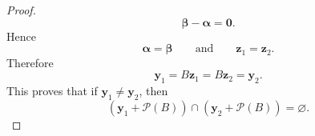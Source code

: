 \begin{proof}
	\[
	\boldsymbol\beta-\boldsymbol\alpha=\mathbf 0.
	\]
	Hence
	\[
	\boldsymbol\alpha=\boldsymbol\beta
	\qquad\text{and}\qquad
	\mathbf z_1=\mathbf z_2.
	\]
	Therefore
	\[
	\mathbf y_1=B\mathbf z_1=B\mathbf z_2=\mathbf y_2.
	\]
	This proves that if \(\mathbf y_1\neq \mathbf y_2\), then
	\[
	(\mathbf y_1+\mathcal P(B))\cap(\mathbf y_2+\mathcal P(B))=\varnothing.
	\]
\end{proof}

